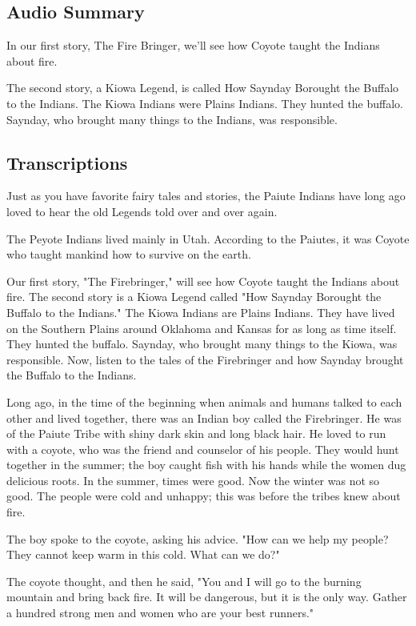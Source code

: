 \subsection{Audio Summary}

In our first story, The Fire Bringer, we'll see how Coyote taught the Indians about fire.

The second story, a Kiowa Legend, is called How Saynday Borought the Buffalo to the Indians. The Kiowa Indians were Plains Indians.
They hunted the buffalo.
Saynday, who brought many things to the Indians, was responsible.

\subsection{Transcriptions}

Just as you have favorite fairy tales and stories, the Paiute Indians have long ago loved to hear the old Legends told over and over again.

The Peyote Indians lived mainly in Utah. According to the Paiutes, it was Coyote who taught mankind how to survive on the earth.

Our first story, "The Firebringer," will see how Coyote taught the Indians about fire. The second story is a Kiowa Legend called "How Saynday Borought the Buffalo to the Indians." The Kiowa Indians are Plains Indians. They have lived on the Southern Plains around Oklahoma and Kansas for as long as time itself. They hunted the buffalo. Saynday, who brought many things to the Kiowa, was responsible. Now, listen to the tales of the Firebringer and how Saynday brought the Buffalo to the Indians.

Long ago, in the time of the beginning when animals and humans talked to each other and lived together, there was an Indian boy called the Firebringer. He was of the Paiute Tribe with shiny dark skin and long black hair. He loved to run with a coyote, who was the friend and counselor of his people. They would hunt together in the summer; the boy caught fish with his hands while the women dug delicious roots. In the summer, times were good. Now the winter was not so good. The people were cold and unhappy; this was before the tribes knew about fire.

The boy spoke to the coyote, asking his advice. "How can we help my people? They cannot keep warm in this cold. What can we do?"

The coyote thought, and then he said, "You and I will go to the burning mountain and bring back fire. It will be dangerous, but it is the only way. Gather a hundred strong men and women who are your best runners."

